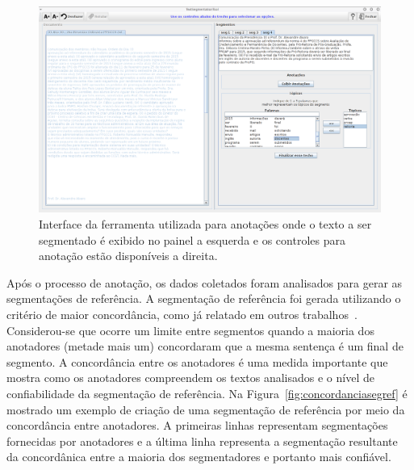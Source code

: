   \begin{figure}[!h]
	  \centering
	  \includegraphics[width=1\textwidth]{conteudo/capitulos/figs/interface-anotacoes.png}
	  \caption{Interface da ferramenta utilizada para anotações onde o texto a ser segmentado é exibido no painel a esquerda e os controles para anotação estão disponíveis a direita.}
	  \label{fig:interfaceanotacoes}
  \end{figure}


  
  Após o processo de anotação, os dados coletados foram analisados para gerar as segmentações de referência. A segmentação de referência foi gerada utilizando o critério de maior concordância, como já relatado em outros trabalhos~\cite{Hearst1997, Cardoso2017, Kazantseva2012, Passonneau1997, Galley2003}. Considerou-se que ocorre um limite entre segmentos quando a maioria dos anotadores (metade mais um) concordaram que a mesma sentença é um final de segmento. A concordância entre os anotadores é uma medida importante que mostra como os anotadores compreendem os textos analisados e o nível de confiabilidade da segmentação de referência. Na Figura~\ref{fig:concordanciasegref} é mostrado um exemplo de criação de uma segmentação de referência por meio da concordância entre anotadores. A primeiras linhas representam segmentações fornecidas por anotadores e a última linha representa a segmentação resultante da concordânica entre a maioria dos segmentadores e portanto mais confiável. 


